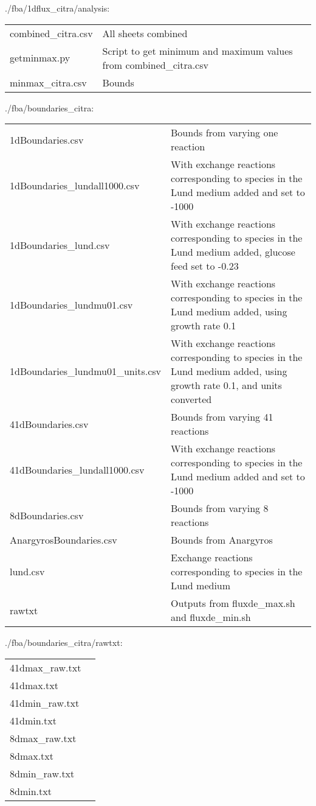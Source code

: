 \documentclass[a4paper, parskip=full]{scrreprt}
\begin{document}
./fba/1dflux\_citra/analysis:

\begin{longtable}{ll}
combined\_citra.csv & All sheets combined\\
getminmax.py & Script to get minimum and maximum values from combined\_citra.csv\\
minmax\_citra.csv & Bounds
\end{longtable}

./fba/boundaries\_citra:

\begin{longtable}{ll}
1dBoundaries.csv & Bounds from varying one reaction\\
1dBoundaries\_lundall1000.csv & With exchange reactions corresponding to species in the Lund medium added and set to -1000\\
1dBoundaries\_lund.csv & With exchange reactions corresponding to species in the Lund medium added, glucose feed set to -0.23\\
1dBoundaries\_lundmu01.csv & With exchange reactions corresponding to species in the Lund medium added, using growth rate 0.1 \\
1dBoundaries\_lundmu01\_units.csv &  With exchange reactions corresponding to species in the Lund medium added, using growth rate 0.1, and units converted\\
41dBoundaries.csv & Bounds from varying 41 reactions\\
41dBoundaries\_lundall1000.csv & With exchange reactions corresponding to species in the Lund medium added and set to -1000\\
8dBoundaries.csv & Bounds from varying 8 reactions\\
AnargyrosBoundaries.csv & Bounds from Anargyros\\
lund.csv & Exchange reactions corresponding to species in the Lund medium\\
rawtxt & Outputs from fluxde\_max.sh and fluxde\_min.sh
\end{longtable}

./fba/boundaries\_citra/rawtxt:

\begin{longtable}{ll}
41dmax\_raw.txt\\
41dmax.txt\\
41dmin\_raw.txt\\
41dmin.txt\\
8dmax\_raw.txt\\
8dmax.txt\\
8dmin\_raw.txt\\
8dmin.txt
\end{longtable}
\end{document}
